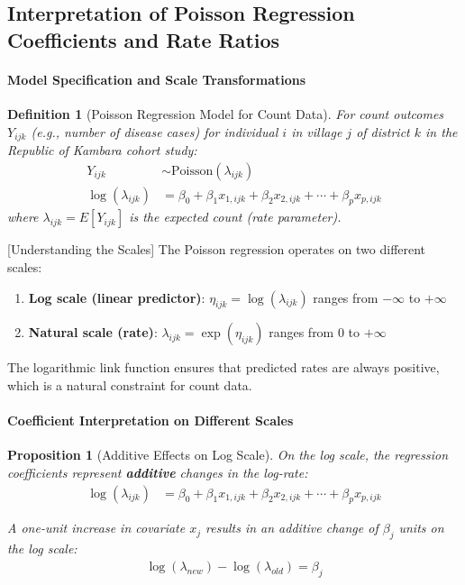 \documentclass{article}
\newtheorem{definition}{Definition}
\newtheorem{proposition}{Proposition}
\begin{document}
\subsection{Interpretation of Poisson Regression Coefficients and Rate Ratios}

\paragraph{Model Specification and Scale Transformations}

\begin{definition}[Poisson Regression Model for Count Data]
For count outcomes $Y_{ijk}$ (e.g., number of disease cases) for individual $i$ in village $j$ of district $k$ in the Republic of Kambara cohort study:
\begin{align}
Y_{ijk} &\sim \text{Poisson}(\lambda_{ijk}) \label{eq:poisson_dist}\\
\log(\lambda_{ijk}) &= \beta_0 + \beta_1 x_{1,ijk} + \beta_2 x_{2,ijk} + \cdots + \beta_p x_{p,ijk} \label{eq:log_linear}
\end{align}
where $\lambda_{ijk} = E[Y_{ijk}]$ is the expected count (rate parameter).
\end{definition}

[Understanding the Scales]
The Poisson regression operates on two different scales:
\begin{enumerate}
    \item \textbf{Log scale (linear predictor)}: $\eta_{ijk} = \log(\lambda_{ijk})$ ranges from $-\infty$ to $+\infty$
    \item \textbf{Natural scale (rate)}: $\lambda_{ijk} = \exp(\eta_{ijk})$ ranges from $0$ to $+\infty$
\end{enumerate}

The logarithmic link function ensures that predicted rates are always positive, which is a natural constraint for count data.


\paragraph{Coefficient Interpretation on Different Scales}

\begin{proposition}[Additive Effects on Log Scale]
On the log scale, the regression coefficients represent \textbf{additive} changes in the log-rate:
\begin{align}
\log(\lambda_{ijk}) &= \beta_0 + \beta_1 x_{1,ijk} + \beta_2 x_{2,ijk} + \cdots + \beta_p x_{p,ijk}
\end{align}

A one-unit increase in covariate $x_j$ results in an additive change of $\beta_j$ units on the log scale:
\begin{align}
\log(\lambda_{new}) - \log(\lambda_{old}) = \beta_j
\end{align}
\end{proposition}
\end{document}
